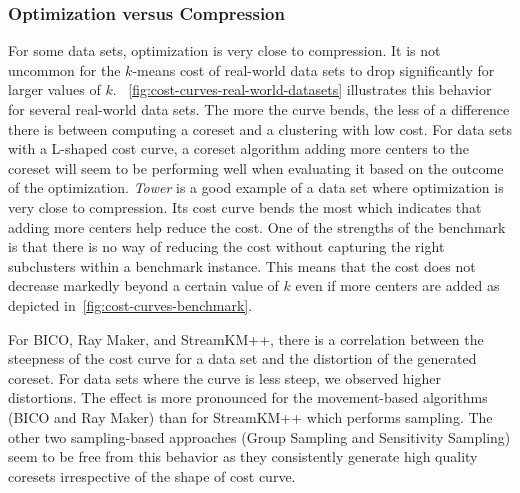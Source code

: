 \subsubsection*{Optimization versus Compression}
For some data sets, optimization is very close to compression. It is not uncommon for the $k$-means cost of real-world data sets to drop significantly for larger values of $k$.
~\cref{fig:cost-curves-real-world-datasets} illustrates this behavior for several real-world data sets. The more the curve bends, the less of a difference there is between computing a coreset and a clustering with low cost. For data sets with a L-shaped cost curve, a coreset algorithm adding more centers to the coreset will seem to be performing well when evaluating it based on the outcome of the optimization.
\textit{Tower} is a good example of a data set where optimization is very close to compression. Its cost curve bends the most which indicates that adding more centers help reduce the cost. One of the strengths of the benchmark is that there is no way of reducing the cost without capturing the right subclusters within a benchmark instance. This means that the cost does not decrease markedly beyond a certain value of $k$ even if more centers are added as depicted in~\cref{fig:cost-curves-benchmark}. 

For BICO, Ray Maker, and StreamKM++, there is a correlation between the steepness of the cost curve for a data set and the distortion of the generated coreset. 
For data sets where the curve is less steep, we observed higher distortions. The effect is more pronounced for the movement-based algorithms (BICO and Ray Maker) than for StreamKM++ which performs sampling. The other two sampling-based approaches (Group Sampling and Sensitivity Sampling) seem to be free from this behavior as they consistently generate high quality coresets irrespective of the shape of cost curve.







